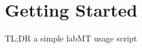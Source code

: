 







\section{Getting Started}
\label{getting-started:welcome-to-labmt-simple-s-documentation}\label{getting-started:getting-started}\label{getting-started::doc}
TL;DR
a simple labMT usage script


